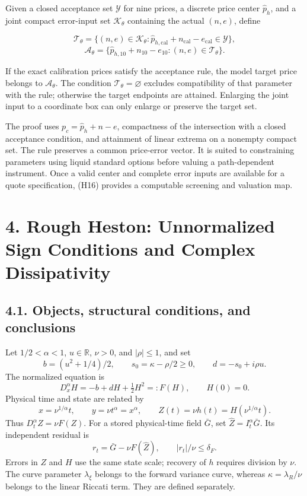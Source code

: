\documentclass[a4paper,11pt]{article}
\begin{document}
Given a closed acceptance set $\mathcal Y$ for nine prices, a discrete price center \(\widehat p_h\), and a joint compact error-input set $\mathcal K_\theta$ containing the actual $(n,e)$, define

\[
\mathcal T_\theta=
\{(n,e)\in\mathcal K_\theta:
\widehat p_{h,\mathrm{cal}}+n_{\mathrm{cal}}-e_{\mathrm{cal}}
\in\mathcal Y\},
\]
\[
\mathcal A_\theta=
\{\widehat p_{h,10}+n_{10}-e_{10}:(n,e)\in\mathcal T_\theta\}.
\tag{H16}
\]

If the exact calibration prices satisfy the acceptance rule, the model target price belongs to $\mathcal A_\theta$. The condition $\mathcal T_\theta=\varnothing$ excludes compatibility of that parameter with the rule; otherwise the target endpoints are attained. Enlarging the joint input to a coordinate box can only enlarge or preserve the target set.

The proof uses $p_c=\widehat p_h+n-e$, compactness of the intersection with a closed acceptance condition, and attainment of linear extrema on a nonempty compact set. The rule preserves a common price-error vector. It is suited to constraining parameters using liquid standard options before valuing a path-dependent instrument. Once a valid center and complete error inputs are available for a quote specification, (H16) provides a computable screening and valuation map.

\section*{4. Rough Heston: Unnormalized Sign Conditions and Complex Dissipativity}

\subsection*{4.1. Objects, structural conditions, and conclusions}

Let \(1/2<\alpha<1\), \(u\in\mathbb R\), \(\nu>0\), and \(|\rho|\le1\), and set
\[
b=(u^2+1/4)/2,\qquad s_0=\kappa-\rho/2\ge0,\qquad d=-s_0+i\rho u.
\]
The normalized equation is
\[
D_x^\alpha H=-b+dH+\tfrac12H^2=:F(H),\qquad H(0)=0.
\tag{R1}
\]
Physical time and state are related by
\[
x=\nu^{1/\alpha}t,\qquad y=\nu t^\alpha=x^\alpha,\qquad Z(t)=\nu h(t)=H(\nu^{1/\alpha}t).
\tag{R2}
\]
Thus \(D_t^\alpha Z=\nu F(Z)\). For a stored physical-time field \(\bar G\), set \(\widehat Z=I_t^\alpha\bar G\). Its independent residual is
\[
r_t=\bar G-\nu F(\widehat Z),\qquad |r_t|/\nu\le\delta_F.
\tag{R3}
\]
Errors in \(Z\) and \(H\) use the same state scale; recovery of \(h\) requires division by \(\nu\). The curve parameter \(\lambda_\xi\) belongs to the forward variance curve, whereas \(\kappa=\lambda_R/\nu\) belongs to the linear Riccati term. They are defined separately.
\end{document}
